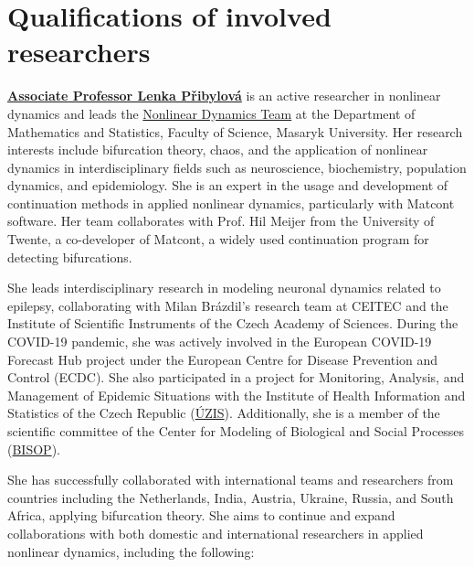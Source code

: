 \documentclass[a4paper,11pt]{scrartcl}
\begin{document}
\section{Qualifications of involved researchers}\label{sec:qualifications}




\href{https://orcid.org/0000-0002-9027-4333}{\textbf{Associate Professor Lenka Přibylová}} is an active researcher in nonlinear dynamics and leads the \href{https://science.math.muni.cz/ndteam/}{Nonlinear Dynamics Team} at the Department of Mathematics and Statistics, Faculty of Science, Masaryk University. Her research interests include bifurcation theory, chaos, and the application of nonlinear dynamics in interdisciplinary fields such as neuroscience, biochemistry, population dynamics, and epidemiology. She is an expert in the usage and development of continuation methods in applied nonlinear dynamics, particularly with Matcont software. Her team collaborates with Prof. Hil Meijer from the University of Twente, a co-developer of Matcont, a widely used continuation program for detecting bifurcations.

She leads interdisciplinary research in modeling neuronal dynamics related to epilepsy, collaborating with Milan Brázdil's research team at CEITEC and the Institute of Scientific Instruments of the Czech Academy of Sciences. During the COVID-19 pandemic, she was actively involved in the European COVID-19 Forecast Hub project under the European Centre for Disease Prevention and Control (ECDC). She also participated in a project for Monitoring, Analysis, and Management of Epidemic Situations with the Institute of Health Information and Statistics of the Czech Republic (\href{https://www.uzis.cz/}{ÚZIS}). Additionally, she is a member of the scientific committee of the Center for Modeling of Biological and Social Processes (\href{https://www.bisop.eu/}{BISOP}).

She has successfully collaborated with international teams and researchers from countries including the Netherlands, India, Austria, Ukraine, Russia, and South Africa, applying bifurcation theory. She aims to continue and expand collaborations with both domestic and international researchers in applied nonlinear dynamics, including the following:
\end{document}

